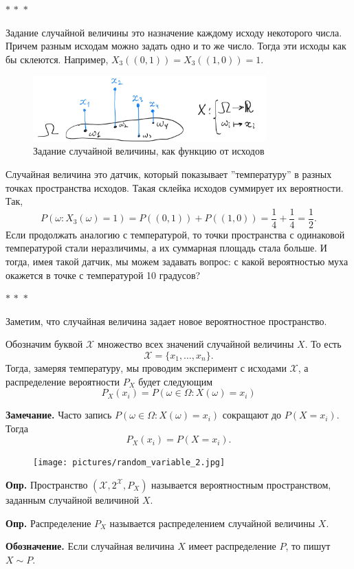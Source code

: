 \documentclass[a4paper,12pt]{article}
\newcommand{\threestars}{\begin{center}$ {\ast}\,{\ast}\,{\ast} $\end{center}}
\newcounter{th-counter}
\newcounter{df-counter}
\newcounter{notion-counter}
\newcommand{\df}{\par\noindent\textbf{Опр.} }
\newcommand{\note}{\par\noindent\textbf{Замечание.} }
\newcommand{\notion}{\par\noindent%
	\textbf{Обозначение.} }
\begin{document}
\threestars
Задание случайной величины это назначение каждому исходу некоторого числа. Причем разным исходам можно задать одно и то же число. Тогда эти исходы как бы склеются. Например, $X_3((0,1)) = X_3((1,0)) = 1$.

\begin{figure}[h] %
    \centering
    \includegraphics[width=0.8\textwidth]{pictures/random_variable_1.jpg}
    \caption{Задание случайной величины, как функцию от исходов}
\end{figure}

Случайная величина это датчик, который показывает ''температуру'' в разных точках пространства исходов.
Такая склейка исходов суммирует их вероятности. Так,
\[
P(\omega: X_3(\omega) = 1) = P((0,1)) + P((1,0)) = \frac{1}{4} + \frac{1}{4} = \frac{1}{2}.
\]
Если продолжать аналогию с температурой, то точки пространства с одинаковой температурой стали неразличимы, а их суммарная площадь стала больше. И тогда, имея такой датчик, мы можем задавать вопрос: с какой вероятностью муха окажется в точке с температурой 10 градусов?

\threestars
Заметим, что случайная величина задает новое вероятностное пространство.

Обозначим буквой $\mathcal{X}$ множество всех значений случайной величины $X$. То есть
\[
\mathcal{X} = \{x_1, \ldots, x_n\}.
\]
Тогда, замеряя температуру, мы проводим эксперимент с исходами $\mathcal{X}$, а распределение вероятности $P_X$ будет следующим
\[
P_X(x_i) = P(\omega \in \Omega: X(\omega) = x_i)
\]
\note Часто запись $P(\omega \in \Omega: X(\omega) = x_i)$ сокращают до $P(X = x_i)$. Тогда
\[
P_X(x_i) = P(X = x_i).
\]
\begin{figure}[h] %
    \centering
    \texttt{[image: pictures/random\_variable\_2.jpg]}
\end{figure}
\df Пространство $(\mathcal{X}, 2^\mathcal{X}, P_X)$ называется вероятностным пространством, заданным случайной величиной $X$.

\df Распределение $P_X$ называется распределением случайной величины $X$. 

\notion Если случайная величина $X$ имеет распределение $P$, то пишут \mbox{$X \sim P$}.
\end{document}
